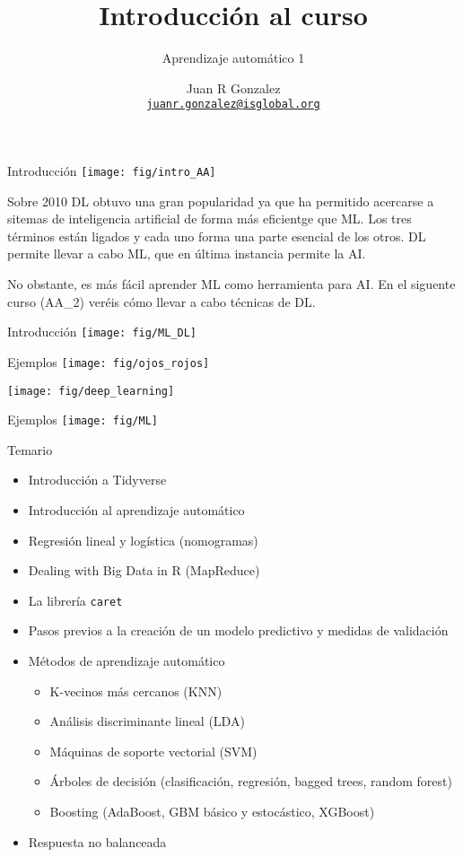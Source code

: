 \documentclass[
  ignorenonframetext,
]{beamer}
\title{Introducción al curso}
\subtitle{Aprendizaje automático 1}
\author{Juan R Gonzalez\\
\href{mailto:juanr.gonzalez@isglobal.org}{\nolinkurl{juanr.gonzalez@isglobal.org}}}
\date{}
\institute{UAB - Department of Mathematics\\
BRGE - Bioinformatics Research Group in Epidemiology\\
ISGlobal - Barcelona Institute for Global Health\\
\url{http://brge.isglobal.org}}
\providecommand{\tightlist}{%
  \setlength{\itemsep}{0pt}\setlength{\parskip}{0pt}}
\begin{document}
\frame{\titlepage}

\begin{frame}{Introducción}
\protect\hypertarget{introducciuxf3n}{}
\texttt{[image: fig/intro\_AA]}

Sobre 2010 DL obtuvo una gran popularidad ya que ha permitido acercarse
a sitemas de inteligencia artificial de forma más eficientge que ML. Los
tres términos están ligados y cada uno forma una parte esencial de los
otros. DL permite llevar a cabo ML, que en última instancia permite la
AI.

No obstante, es más fácil aprender ML como herramienta para AI. En el
siguente curso (AA\_2) veréis cómo llevar a cabo técnicas de DL.
\end{frame}

\begin{frame}{Introducción}
\protect\hypertarget{introducciuxf3n-1}{}
\texttt{[image: fig/ML\_DL]}
\end{frame}

\begin{frame}{Ejemplos}
\protect\hypertarget{ejemplos}{}
\texttt{[image: fig/ojos\_rojos]}

\texttt{[image: fig/deep\_learning]}
\end{frame}

\begin{frame}{Ejemplos}
\protect\hypertarget{ejemplos-1}{}
\texttt{[image: fig/ML]}
\end{frame}

\begin{frame}[fragile]{Temario}
\protect\hypertarget{temario}{}
\begin{itemize}
\tightlist
\item
  Introducción a Tidyverse
\item
  Introducción al aprendizaje automático
\item
  Regresión lineal y logística (nomogramas)
\item
  Dealing with Big Data in R (MapReduce)
\item
  La librería \texttt{caret}
\item
  Pasos previos a la creación de un modelo predictivo y medidas de
  validación
\item
  Métodos de aprendizaje automático

  \begin{itemize}
  \tightlist
  \item
    K-vecinos más cercanos (KNN)
  \item
    Análisis discriminante lineal (LDA)
  \item
    Máquinas de soporte vectorial (SVM)
  \item
    Árboles de decisión (clasificación, regresión, bagged trees, random
    forest)
  \item
    Boosting (AdaBoost, GBM básico y estocástico, XGBoost)
  \end{itemize}
\item
  Respuesta no balanceada
\end{itemize}
\end{frame}
\end{document}
